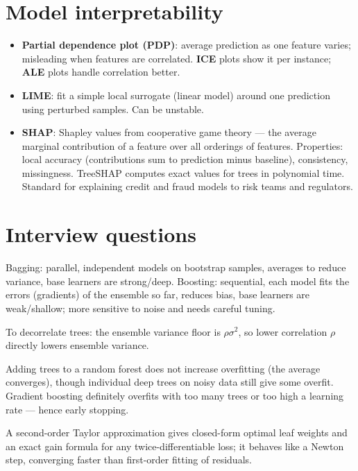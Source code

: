 \section{Model interpretability}
\begin{itemize}
  \item \textbf{Partial dependence plot (PDP)}: average prediction as one feature varies; misleading when features are correlated. \textbf{ICE} plots show it per instance; \textbf{ALE} plots handle correlation better.
  \item \textbf{LIME}: fit a simple local surrogate (linear model) around one prediction using perturbed samples. Can be unstable.
  \item \textbf{SHAP}: Shapley values from cooperative game theory --- the average marginal contribution of a feature over all orderings of features. Properties: local accuracy (contributions sum to prediction minus baseline), consistency, missingness. TreeSHAP computes exact values for trees in polynomial time. Standard for explaining credit and fraud models to risk teams and regulators.
\end{itemize}

\section{Interview questions}
\A Bagging: parallel, independent models on bootstrap samples, averages to reduce variance, base learners are strong/deep. Boosting: sequential, each model fits the errors (gradients) of the ensemble so far, reduces bias, base learners are weak/shallow; more sensitive to noise and needs careful tuning.

\A To decorrelate trees: the ensemble variance floor is $\rho\sigma^2$, so lower correlation $\rho$ directly lowers ensemble variance.

\A Adding trees to a random forest does not increase overfitting (the average converges), though individual deep trees on noisy data still give some overfit. Gradient boosting definitely overfits with too many trees or too high a learning rate --- hence early stopping.

\A A second-order Taylor approximation gives closed-form optimal leaf weights and an exact gain formula for any twice-differentiable loss; it behaves like a Newton step, converging faster than first-order fitting of residuals.

